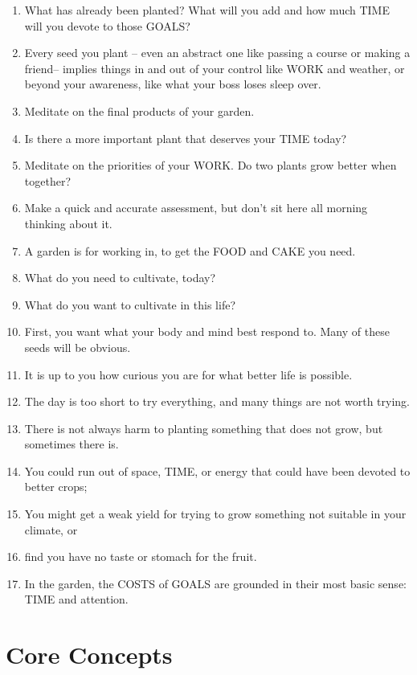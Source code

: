 \documentclass[
]{book}
\begin{document}
\begin{enumerate}
\item
  What has already been planted? What will you add and how much TIME will you
  devote to those GOALS?
\item
  Every seed you plant -- even an abstract one like passing a course or making a
  friend-- implies things in and out of your control like WORK and weather, or
  beyond your awareness, like what your boss loses sleep over.
\item
  Meditate on the final products of your garden.
\item
  Is there a more important plant that deserves your TIME today?
\item
  Meditate on the priorities of your WORK. Do two plants grow better when
  together?
\item
  Make a quick and accurate assessment, but don't sit here all morning thinking
  about it.
\item
  A garden is for working in, to get the FOOD and CAKE you need.
\item
  What do you need to cultivate, today?
\item
  What do you want to cultivate in this life?
\item
  First, you want what your body and mind best respond to. Many of these seeds
  will be obvious.
\item
  It is up to you how curious you are for what better life is possible.
\item
  The day is too short to try everything, and many things are not worth trying.
\item
  There is not always harm to planting something that does not grow, but
  sometimes there is.
\item
  You could run out of space, TIME, or energy that could have been devoted to
  better crops;
\item
  You might get a weak yield for trying to grow something not suitable in your
  climate, or
\item
  find you have no taste or stomach for the fruit.
\item
  In the garden, the COSTS of GOALS are grounded in their most basic sense: TIME
  and attention.
\end{enumerate}

\hypertarget{core-concepts}{%
\section{Core Concepts}\label{core-concepts}}
\end{document}
